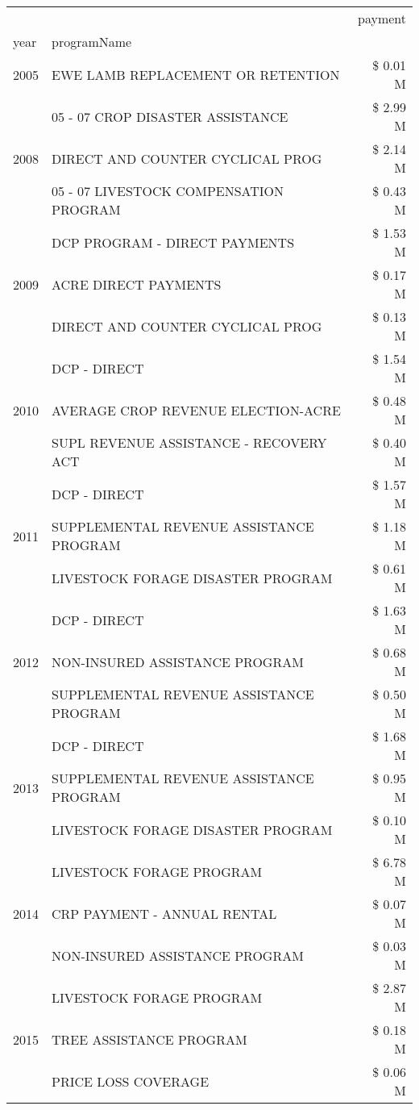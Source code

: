 \begin{tabular}{llr}
\toprule
 &  & payment \\
year & programName &  \\
\midrule
2005 & EWE LAMB REPLACEMENT OR RETENTION & \$ 0.01 M \\
\cline{1-3}
\multirow[t]{3}{*}{2008} & 05 - 07 CROP DISASTER ASSISTANCE & \$ 2.99 M \\
 & DIRECT AND COUNTER CYCLICAL PROG & \$ 2.14 M \\
 & 05 - 07 LIVESTOCK COMPENSATION PROGRAM & \$ 0.43 M \\
\cline{1-3}
\multirow[t]{3}{*}{2009} & DCP PROGRAM - DIRECT PAYMENTS & \$ 1.53 M \\
 & ACRE DIRECT PAYMENTS & \$ 0.17 M \\
 & DIRECT AND COUNTER CYCLICAL PROG & \$ 0.13 M \\
\cline{1-3}
\multirow[t]{3}{*}{2010} & DCP - DIRECT & \$ 1.54 M \\
 & AVERAGE CROP REVENUE ELECTION-ACRE & \$ 0.48 M \\
 & SUPL REVENUE ASSISTANCE - RECOVERY ACT & \$ 0.40 M \\
\cline{1-3}
\multirow[t]{3}{*}{2011} & DCP - DIRECT & \$ 1.57 M \\
 & SUPPLEMENTAL REVENUE ASSISTANCE PROGRAM & \$ 1.18 M \\
 & LIVESTOCK FORAGE DISASTER PROGRAM & \$ 0.61 M \\
\cline{1-3}
\multirow[t]{3}{*}{2012} & DCP - DIRECT & \$ 1.63 M \\
 & NON-INSURED ASSISTANCE PROGRAM & \$ 0.68 M \\
 & SUPPLEMENTAL REVENUE ASSISTANCE PROGRAM & \$ 0.50 M \\
\cline{1-3}
\multirow[t]{3}{*}{2013} & DCP - DIRECT & \$ 1.68 M \\
 & SUPPLEMENTAL REVENUE ASSISTANCE PROGRAM & \$ 0.95 M \\
 & LIVESTOCK FORAGE DISASTER PROGRAM & \$ 0.10 M \\
\cline{1-3}
\multirow[t]{3}{*}{2014} & LIVESTOCK FORAGE PROGRAM & \$ 6.78 M \\
 & CRP PAYMENT - ANNUAL RENTAL & \$ 0.07 M \\
 & NON-INSURED ASSISTANCE PROGRAM & \$ 0.03 M \\
\cline{1-3}
\multirow[t]{3}{*}{2015} & LIVESTOCK FORAGE PROGRAM & \$ 2.87 M \\
 & TREE ASSISTANCE PROGRAM & \$ 0.18 M \\
 & PRICE LOSS COVERAGE & \$ 0.06 M \\

\end{tabular}
